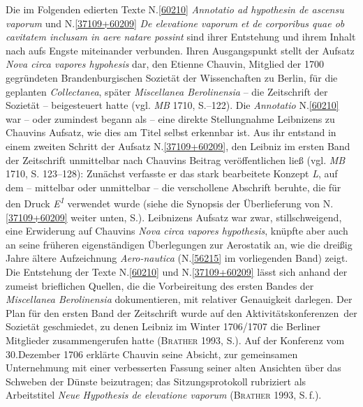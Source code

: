 \footnotesize%
\pstart%
\noindent%
%
%
%
%
Die im Folgenden edierten Texte N.\;\ref{60210} \textit{Annotatio ad hypothesin de ascensu vaporum} und N.\;\ref{37109+60209} \textit{De elevatione vaporum et de corporibus quae ob cavitatem inclusam in aere natare possint} sind ihrer Entstehung und ihrem Inhalt nach aufs Engste miteinander verbunden.
Ihren Ausgangspunkt stellt der Aufsatz \textit{Nova circa vapores hypohesis} dar, den Etienne Chauvin, Mitglied der 1700 gegründeten Brandenburgischen Sozietät der Wissenchaften zu Berlin, für die geplanten \textit{Collectanea}, später \textit{Miscellanea Berolinensia} -- die Zeitschrift der Sozietät -- beigesteuert hatte (vgl. \textit{MB} 1710, S.--122).\cite{01415}\cite{01411}
Die \textit{Annotatio} N.\;\ref{60210} war -- oder zumindest begann als -- eine direkte Stellungnahme Leibnizens zu Chauvins Aufsatz, wie dies am Titel selbst erkennbar ist.
Aus ihr entstand in einem zweiten Schritt der Aufsatz N.\;\ref{37109+60209}, den Leibniz im ersten Band der Zeitschrift unmittelbar nach Chauvins Beitrag veröffentlichen ließ (vgl. \textit{MB} 1710, S. 123–128):\cite{01412}\cite{01411}
Zunächst verfasste er das stark bearbeitete Konzept \textit{L}, auf dem -- mittelbar oder unmittelbar -- die verschollene Abschrift beruhte, die für den Druck \textit{E\textsuperscript{1}} verwendet wurde (siehe die Synopsis der Überlieferung von N.\;\ref{37109+60209} weiter unten, S.\;\pageref{MB_1710_123-128+LH_37_03_120-122_uebrlief}).
Leibnizens Aufsatz war zwar, stillschweigend, eine Erwiderung auf Chauvins \textit{Nova circa vapores hypothesis}\cite{01415}, knüpfte aber auch an seine früheren eigenständigen Überlegungen zur Aerostatik an, wie die dreißig Jahre ältere Aufzeichnung \textit{Aero-nautica} (N.\;\ref{56215} im vorliegenden Band) zeigt.
Die Entstehung der Texte N.\;\ref{60210} und N.\;\ref{37109+60209} lässt sich anhand der zumeist brieflichen Quellen, die die Vorbeireitung des ersten Bandes der \textit{Miscellanea Berolinensia} dokumentieren, mit relativer Genauigkeit darlegen.
\pend%
\pstart%
Der Plan für den ersten Band der Zeitschrift wurde auf den \glqq Aktivitätskonferenzen\grqq\ der Sozietät geschmiedet, zu denen Leibniz im Winter 1706/1707 die Berliner Mitglieder zusammengerufen hatte (\textsc{Brather} 1993, S.).\cite{01419} %
Auf der Konferenz vom 30.\;Dezember 1706 erklärte Chauvin seine Absicht, zur gemeinsamen Unternehmung mit einer verbesserten Fassung seiner alten Ansichten über das Schweben der Dünste beizutragen; das Sitzungsprotokoll rubriziert als Arbeitstitel \textit{Neue Hypothesis de elevatione vaporum} (\textsc{Brather} 1993, S.\,f.).\cite{01419} %
